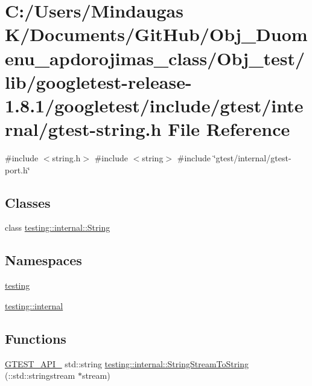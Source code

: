 \hypertarget{_obj__test_2lib_2googletest-release-1_88_81_2googletest_2include_2gtest_2internal_2gtest-string_8h}{}\section{C\+:/\+Users/\+Mindaugas K/\+Documents/\+Git\+Hub/\+Obj\+\_\+\+Duomenu\+\_\+apdorojimas\+\_\+class/\+Obj\+\_\+test/lib/googletest-\/release-\/1.8.1/googletest/include/gtest/internal/gtest-\/string.h File Reference}
\label{_obj__test_2lib_2googletest-release-1_88_81_2googletest_2include_2gtest_2internal_2gtest-string_8h}
{\ttfamily \#include $<$string.\+h$>$}\newline
{\ttfamily \#include $<$string$>$}\newline
{\ttfamily \#include \char`\"{}gtest/internal/gtest-\/port.\+h\char`\"{}}\newline
\subsection*{Classes}
\begin{DoxyCompactItemize}
\item 
class \mbox{\hyperlink{classtesting_1_1internal_1_1_string}{testing\+::internal\+::\+String}}
\end{DoxyCompactItemize}
\subsection*{Namespaces}
\begin{DoxyCompactItemize}
\item 
 \mbox{\hyperlink{namespacetesting}{testing}}
\item 
 \mbox{\hyperlink{namespacetesting_1_1internal}{testing\+::internal}}
\end{DoxyCompactItemize}
\subsection*{Functions}
\begin{DoxyCompactItemize}
\item 
\mbox{\hyperlink{_obj__test_2lib_2googletest-release-1_88_81_2googletest_2include_2gtest_2internal_2gtest-port_8h_aa73be6f0ba4a7456180a94904ce17790}{G\+T\+E\+S\+T\+\_\+\+A\+P\+I\+\_\+}} std\+::string \mbox{\hyperlink{namespacetesting_1_1internal_ac0a2b7f69fc829d80a39e925b6417e39}{testing\+::internal\+::\+String\+Stream\+To\+String}} (\+::std\+::stringstream $\ast$stream)
\end{DoxyCompactItemize}
